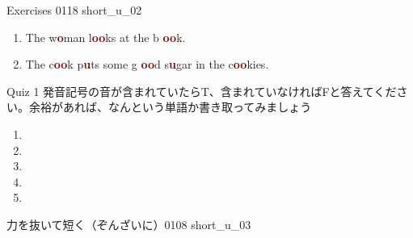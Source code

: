 \documentclass[aspectratio=169, xcolor={dvipsnames,table}]{beamer}
\begin{document}
\begin{frame}[plain]{Exercises }
  \hfill{\tiny 0118}\,{\scriptsize {}\,{\tiny short\_u\_02}}
  \pause \LARGE
  \begin{enumerate}[<+->]
    \item The w\textcolor{Maroon}{\bfseries o}man l\textcolor{Maroon}{\bfseries oo}ks at the b\textcolor{Maroon}{\bfseries
            oo}k.

    \item The c\textcolor{Maroon}{\bfseries oo}k p\textcolor{Maroon}{\bfseries u}ts some g\textcolor{Maroon}{\bfseries
            oo}d s\textcolor{Maroon}{\bfseries u}gar in the c\textcolor{Maroon}{\bfseries oo}kies.
  \end{enumerate}
\end{frame}
\begin{frame}[plain]{Quiz 1}
  発音記号の音が含まれていたらT、含まれていなければFと答えてください。余裕があれば、なんという単語か書き取ってみましょう

  \LARGE
  \begin{enumerate}
    \item \mbox{}\hspace{40pt}\hspace{150pt}\mbox{}

    \item \mbox{}\hspace{40pt}\hspace{150pt}\mbox{}

    \item \mbox{}\hspace{40pt}\hspace{150pt}\mbox{}

    \item \mbox{}\hspace{40pt}\hspace{150pt}\mbox{}

    \item \mbox{}\hspace{40pt}\hspace{150pt}\mbox{}
  \end{enumerate}

   {\scriptsize 力を抜いて短く（ぞんざいに）}\hfill{\tiny 0108}\,{\scriptsize {}\,{\tiny short\_u\_03}}
\end{frame}
\end{document}
